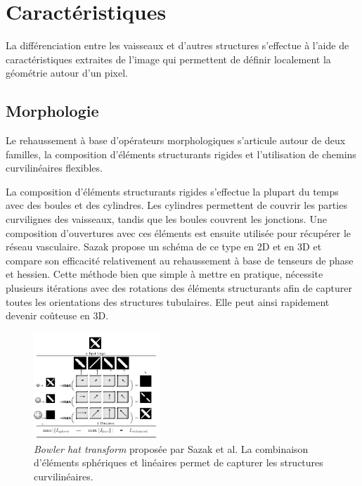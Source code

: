 \section{Caractéristiques}

La différenciation entre les vaisseaux et d'autres structures s'effectue à l'aide de caractéristiques extraites de l'image qui permettent de définir localement la géométrie autour d'un pixel. 

\subsection{Morphologie}
\label{sec:EA:rehaussement:morpho}

Le rehaussement à base d'opérateurs morphologiques s'articule autour de deux familles, la composition d'éléments structurants rigides et l'utilisation de chemins curvilinéaires flexibles.

La composition d'éléments structurants rigides s'effectue la plupart du temps avec des boules et des cylindres. Les cylindres permettent de couvrir les parties curvilignes des vaisseaux, tandis que les boules couvrent les jonctions. Une composition d'ouvertures avec ces éléments est ensuite utilisée pour récupérer le réseau vasculaire. Sazak propose un schéma de ce type en 2D \cite{Sazak2019_bowler_hat_2D} et en 3D \cite{Sazak2018_bowler_hat_3D} et compare son efficacité relativement au rehaussement à base de tenseurs de phase et hessien. Cette méthode bien que simple à mettre en pratique, nécessite plusieurs itérations avec des rotations des éléments structurants afin de capturer toutes les orientations des structures tubulaires. Elle peut ainsi rapidement devenir coûteuse en 3D.

\begin{figure}[h]
  \centering
  \includegraphics[height=4cm]{Images/bowlerHat_3D.png}
  \caption{\textit{Bowler hat transform} proposée par Sazak et al. La combinaison d'éléments sphériques et linéaires permet de capturer les structures curvilinéaires. }
  \label{fig:sazak_bowler_hat}
\end{figure}

